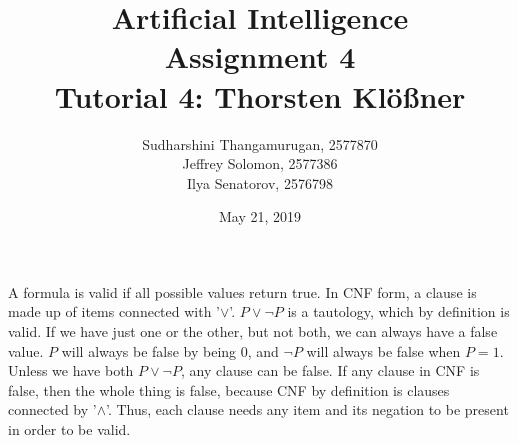 \documentclass[11pt, letterpaper]{exam}
\title{Artificial Intelligence \\ Assignment  4 \\ Tutorial 4: Thorsten Klößner}
\author{Sudharshini Thangamurugan, 2577870 \\ Jeffrey Solomon, 2577386 \\ Ilya Senatorov, 2576798}
\date{May 21, 2019}
\begin{document}
  \maketitle

  \begin{questions}
    \setcounter{question}{13}
    \question
    A formula is valid if all possible values return true.
    In CNF form, a clause is made up of items connected with '$\lor$'. $P \lor \neg P$ is a tautology, which by definition is valid.
    If we have just one or the other, but not both, we can always have a false value.
    $P$ will always be false by being 0, and $\neg P$ will always be false when $P = 1$.
    Unless we have both $P \lor \neg P$, any clause can be false. If any clause in CNF is false,
    then the whole thing is false, because CNF by definition is clauses connected by '$\land$'.
    Thus, each clause needs any item and its negation to be present in order to be valid.

    \vspace{1em}
    \question


    \vspace{1em}
    \question

    \begin{parts}

\end{parts}
\end{questions}
\end{document}

